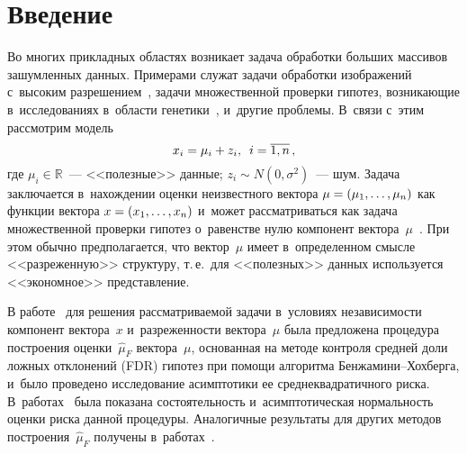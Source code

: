 
  



\thispagestyle{headings}

\begin{multicols}{2}

\label{st\stat}



\section{Введение}

Во многих прикладных областях возникает задача обработки больших массивов 
зашумленных данных. Примерами служат задачи обработки изоб\-ра\-же\-ний с~высоким 
разрешением~\cite{FDRImage}, задачи множественной проверки гипотез, возникающие 
в~\mbox{исследованиях} в~об\-ласти генетики~\cite{MultipleTesting}, и~другие проб\-ле\-мы. 
В~связи с~этим рас\-смот\-рим модель
$$
x_i = \mu_i + z_i, \enskip i=\overline{1,n}\,,
$$
где $\mu_i\in\mathbb{R}$~--- <<полезные>> данные; $z_i \sim N(0,\sigma^2)$~--- 
шум. Задача заключается в~нахождении оценки неизвестного вектора $\mu \hm= 
(\mu_1,\ldots,\mu_n)$ как функции вектора $x \hm= (x_1,\ldots,x_n)$ и~может 
рассматриваться как задача множественной проверки гипотез о~равенстве нулю 
компонент вектора~$\mu$~\cite{AdaptingFDR}. При этом обычно предполагается, что 
вектор~$\mu$ имеет в~определенном смысле <<разреженную>> структуру, т.\,е.\ для 
<<полезных>> данных используется <<экономное>> представление.



В работе~\cite{AdaptingFDR} для решения рассматриваемой задачи в~условиях 
независимости компонент вектора~$x$ и~разреженности вектора~$\mu$ была 
предложена процедура построения оценки~$\hat{\mu}_F$ вектора~$\mu$, основанная 
на методе контроля средней доли ложных отклонений (FDR) 
гипотез при помощи алгоритма Бен\-жа\-ми\-ни--Хох\-бер\-га,
и~было проведено исследование асимптотики ее среднеквадратичного риска. 
В~работах~\cite{ZasShe17,Mathematics2020} была показана состоятельность 
и~асимптотическая нормальность оценки риска данной процедуры. Аналогичные 
результаты для других методов построения~$\hat{\mu}_F$ получены в~работах~\cite{Shestakov2021-1,Shestakov2021-2,Shestakov2022}.


\end{multicols}
